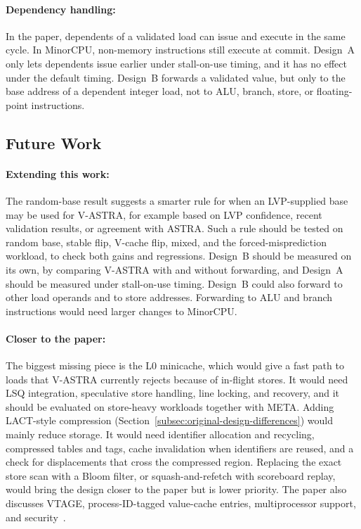 \paragraph{Dependency handling:} In the paper, dependents of a
validated load can issue and execute in the same cycle. In MinorCPU,
non-memory instructions still execute at commit. Design~A only lets
dependents issue earlier under stall-on-use timing, and it has no
effect under the default timing. Design~B forwards a validated value,
but only to the base address of a dependent integer load, not to ALU,
branch, store, or floating-point instructions.

\subsection{Future Work}

\paragraph{Extending this work:} The random-base result suggests a
smarter rule for when an LVP-supplied base may be used for V-ASTRA,
for example based on LVP confidence, recent validation results, or
agreement with ASTRA. Such a rule should be tested on random base,
stable flip, V-cache flip, mixed, and the forced-misprediction
workload, to check both gains and regressions. Design~B should be
measured on its own, by comparing V-ASTRA with and without
forwarding, and Design~A should be measured under stall-on-use
timing. Design~B could also forward to other load operands and to
store addresses. Forwarding to ALU and branch instructions would need
larger changes to MinorCPU.

\paragraph{Closer to the paper:} The biggest missing piece is the
L0 minicache, which would give a fast path to loads that V-ASTRA
currently rejects because of in-flight stores. It would need LSQ
integration, speculative store handling, line locking, and recovery,
and it should be evaluated on store-heavy workloads together with
META. Adding LACT-style compression
(Section~\ref{subsec:original-design-differences}) would mainly reduce
storage. It would need identifier allocation and recycling,
compressed tables and tags, cache invalidation when identifiers are
reused, and a check for displacements that cross the compressed
region. Replacing the exact store scan with a Bloom filter, or
squash-and-refetch with scoreboard replay, would bring the design
closer to the paper but is lower priority. The paper also discusses
VTAGE, process-ID-tagged value-cache entries, multiprocessor support,
and security~\cite{ravenel2025architecting}.

